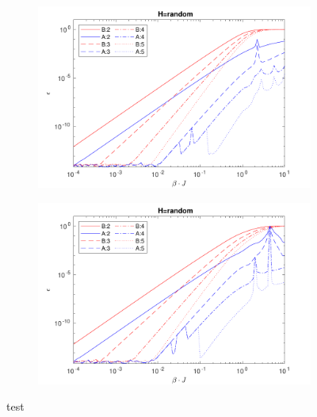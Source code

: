 \begin{figure}[H]
    \begin{subfigure}[]{\textwidth}
        \includegraphics[width=\textwidth]{Figuren/benchmarking/rand_01.pdf}
    \end{subfigure}

    \medskip

    \begin{subfigure}[]{\textwidth}
        \includegraphics[width=\textwidth]{Figuren/benchmarking/rand_02.pdf}
        \label{benchmark:rand2}
    \end{subfigure}

    \caption{test }
\end{figure}

